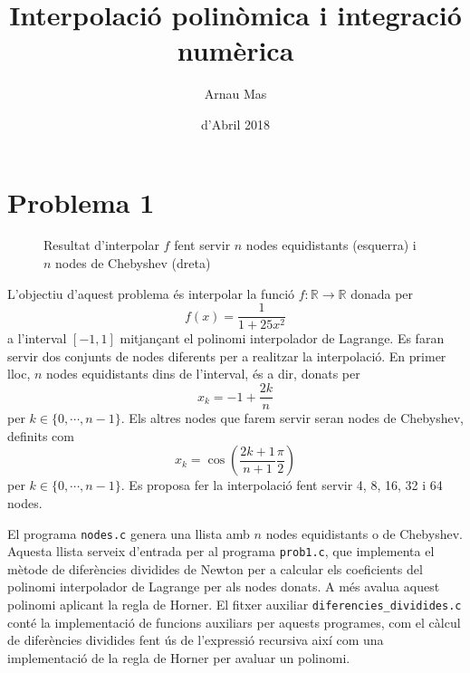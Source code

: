 \documentclass[12pt]{article}
\title{\sffamily {\bfseries Pràctica 3:} Interpolació polinòmica i integració numèrica}
\author{\sffamily Arnau Mas}
\date{\sffamily 24 d'Abril 2018}
\numberwithin{table}{section}
\numberwithin{figure}{section}
\numberwithin{equation}{section}
\newcommand{\R}{\mathbb{R}}
\begin{document}
\maketitle

\section{Problema 1}
\begin{figure}[p]
	\centering
	\sffamily \footnotesize
	
	
	
	
	\caption{Resultat d'interpolar \( f \) fent servir \( n \) nodes equidistants (esquerra) i \( n \) nodes de Chebyshev (dreta)}
	\label{fig:interpolacio}
\end{figure}
L'objectiu d'aquest problema és interpolar la funció \( f \colon \R \to \R \) donada per
\begin{equation*}
	f(x) = \frac{1}{1 + 25x^2}
\end{equation*}
a l'interval \( [-1,1] \) mitjançant el polinomi interpolador de Lagrange. Es faran servir dos conjunts de nodes diferents per a realitzar la interpolació. En primer lloc, \( n \) nodes equidistants dins de l'interval, és a dir, donats per
\begin{equation*}
	x_k = -1 + \frac{2k}{n}
\end{equation*}
per \( k \in \{0, \cdots, n-1\} \). Els altres nodes que farem servir seran nodes de Chebyshev, definits com
\begin{equation*}
	x_k = \cos{\left(\frac{2k+1}{n+1} \frac{\pi}{2}\right)}
\end{equation*}
per \( k \in \{0, \cdots, n-1\} \). Es proposa fer la interpolació fent servir 4, 8, 16, 32 i 64 nodes. 

El programa \texttt{nodes.c} genera una llista amb \( n \) nodes equidistants o de Chebyshev. Aquesta llista serveix d'entrada per al programa \texttt{prob1.c}, que implementa el mètode de diferències dividides de Newton per a calcular els coeficients del polinomi interpolador de Lagrange per als nodes donats. A més avalua aquest polinomi aplicant la regla de Horner. El fitxer auxiliar \texttt{diferencies\_dividides.c} conté la implementació de funcions auxiliars per aquests programes, com el càlcul de diferències dividides fent ús de l'expressió recursiva així com una implementació de la regla de Horner per avaluar un polinomi. 
\end{document}
